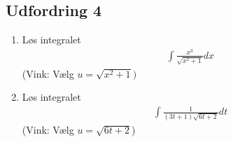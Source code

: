 \subsection*{Udfordring 4}
\begin{enumerate}[label=\roman*)]
	\item Løs integralet
	\begin{align*}
		\int \frac{x^3}{\sqrt{x^2 + 1}} dx
	\end{align*}
	(Vink: Vælg $u = \sqrt{x^2 + 1})$
	\item Løs integralet
	\begin{align*}
		\int \frac{1}{(3t + 1)\sqrt{6t + 2}}dt		
	\end{align*}
	(Vink: Vælg $u = \sqrt{6t+2}$)
\end{enumerate}